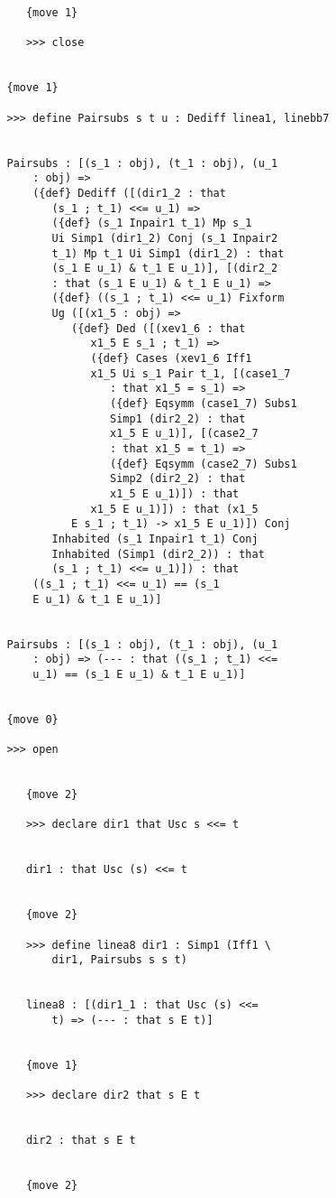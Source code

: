 \documentclass[12pt]{article}
\begin{document}
\begin{verbatim}
      {move 1}

      >>> close


   {move 1}

   >>> define Pairsubs s t u : Dediff linea1, linebb7


   Pairsubs : [(s_1 : obj), (t_1 : obj), (u_1 
       : obj) => 
       ({def} Dediff ([(dir1_2 : that 
          (s_1 ; t_1) <<= u_1) => 
          ({def} (s_1 Inpair1 t_1) Mp s_1 
          Ui Simp1 (dir1_2) Conj (s_1 Inpair2 
          t_1) Mp t_1 Ui Simp1 (dir1_2) : that 
          (s_1 E u_1) & t_1 E u_1)], [(dir2_2 
          : that (s_1 E u_1) & t_1 E u_1) => 
          ({def} ((s_1 ; t_1) <<= u_1) Fixform 
          Ug ([(x1_5 : obj) => 
             ({def} Ded ([(xev1_6 : that 
                x1_5 E s_1 ; t_1) => 
                ({def} Cases (xev1_6 Iff1 
                x1_5 Ui s_1 Pair t_1, [(case1_7 
                   : that x1_5 = s_1) => 
                   ({def} Eqsymm (case1_7) Subs1 
                   Simp1 (dir2_2) : that 
                   x1_5 E u_1)], [(case2_7 
                   : that x1_5 = t_1) => 
                   ({def} Eqsymm (case2_7) Subs1 
                   Simp2 (dir2_2) : that 
                   x1_5 E u_1)]) : that 
                x1_5 E u_1)]) : that (x1_5 
             E s_1 ; t_1) -> x1_5 E u_1)]) Conj 
          Inhabited (s_1 Inpair1 t_1) Conj 
          Inhabited (Simp1 (dir2_2)) : that 
          (s_1 ; t_1) <<= u_1)]) : that 
       ((s_1 ; t_1) <<= u_1) == (s_1 
       E u_1) & t_1 E u_1)]


   Pairsubs : [(s_1 : obj), (t_1 : obj), (u_1 
       : obj) => (--- : that ((s_1 ; t_1) <<= 
       u_1) == (s_1 E u_1) & t_1 E u_1)]


   {move 0}

   >>> open


      {move 2}

      >>> declare dir1 that Usc s <<= t


      dir1 : that Usc (s) <<= t


      {move 2}

      >>> define linea8 dir1 : Simp1 (Iff1 \
          dir1, Pairsubs s s t)


      linea8 : [(dir1_1 : that Usc (s) <<= 
          t) => (--- : that s E t)]


      {move 1}

      >>> declare dir2 that s E t


      dir2 : that s E t


      {move 2}


\end{verbatim}
\end{document}
